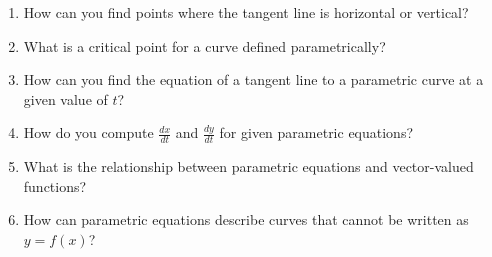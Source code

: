 \begin{enumerate}
  \item How can you find points where the tangent line is horizontal or vertical?
  \item What is a critical point for a curve defined parametrically?
  \item How can you find the equation of a tangent line to a parametric curve at a given value of \(t\)?
  \item How do you compute \(\frac{dx}{dt}\) and \(\frac{dy}{dt}\) for given parametric equations?
  \item What is the relationship between parametric equations and vector-valued functions?
  \item How can parametric equations describe curves that cannot be written as \(y=f(x)\)?
\end{enumerate}
